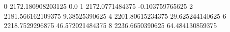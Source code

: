 0 2172.180908203125 0.0
1 2172.0771484375 -0.103759765625
2 2181.566162109375 9.38525390625
4 2201.80615234375 29.625244140625
6 2218.7529296875 46.572021484375
8 2236.6650390625 64.484130859375
